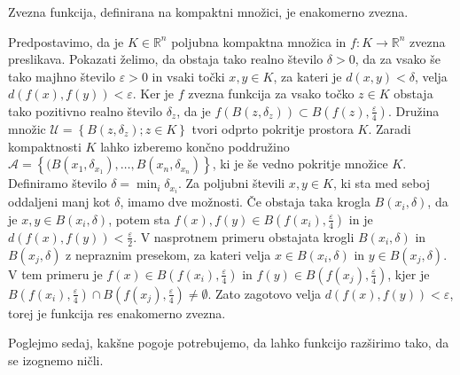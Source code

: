 \documentclass[mat1]{fmfdelo}
\newcommand{\R}{\mathbb R}
\newcommand{\0}{\underline{0}}
\newcommand{\pA}{\mathcal A}
\newcommand{\pU}{\mathcal U}
\begin{document}
\begin{trditev}\label{trd:zvjeenakzv}
Zvezna funkcija, definirana na kompaktni množici, je enakomerno zvezna.
\end{trditev}
\begin{dokaz}
Predpostavimo, da je $K \in \R^n$ poljubna kompaktna množica in $f : K \to \R^n$ zvezna preslikava. Pokazati želimo, da obstaja tako realno število $\delta > 0$, da za vsako še tako majhno število $\varepsilon > 0$ in vsaki točki $x, y \in K$, za kateri je $d(x, y) < \delta$, velja $d(f(x), f(y)) < \varepsilon$. Ker je $f$ zvezna funkcija za vsako točko $z \in K$ obstaja tako pozitivno realno število $\delta_z$, da je $f(B(z, \delta_z)) \subset B(f(z), \frac{\varepsilon}{4})$. Družina množic $\pU = \left \{ B(z, \delta_z); z \in K \right \}$ tvori odprto pokritje prostora $K$. Zaradi kompaktnosti $K$ lahko izberemo končno poddružino $\pA =  \left \{ (B(x_1, \delta_{x_1}), \dots, B(x_n, \delta_{x_n}) \right \}$, ki je še vedno pokritje množice $K$. Definiramo število $\delta = \min_i \delta_{x_i}$. Za poljubni števili $x, y \in K$, ki sta med seboj oddaljeni manj kot $\delta$, imamo dve možnosti. Če obstaja taka krogla $B(x_i, \delta)$, da je $x, y \in B(x_i, \delta)$, potem sta $f(x), f(y) \in B(f(x_i), \frac{\varepsilon}{4})$ in je $d(f(x), f(y)) < \frac{\varepsilon}{2}$. V nasprotnem primeru obstajata krogli  $B(x_i, \delta)$ in $B(x_j, \delta)$ z nepraznim presekom, za kateri velja $x \in B(x_i, \delta)$ in $y \in B(x_j, \delta)$. V tem primeru je $f(x) \in B(f(x_i), \frac{\varepsilon}{4})$ in $f(y) \in B(f(x_j), \frac{\varepsilon}{4})$, kjer je $B(f(x_i), \frac{\varepsilon}{4}) \cap B(f(x_j), \frac{\varepsilon}{4}) \neq \emptyset$. Zato zagotovo velja $d(f(x), f(y)) < \varepsilon$, torej je funkcija res enakomerno zvezna.
\end{dokaz}
Poglejmo sedaj, kakšne pogoje potrebujemo, da lahko funkcijo razširimo tako, da se izognemo ničli.

\end{document}

